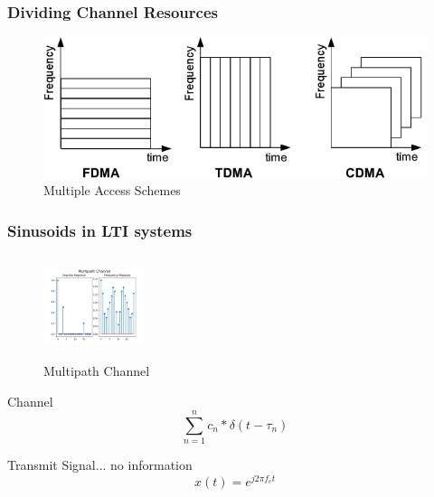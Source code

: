\documentclass{beamer}
\begin{document}


\begin{frame}
	\frametitle{Dividing Channel Resources}
	\begin{figure}
	\includegraphics[scale=1]{Images/Output/FDMA-TDMA-CDMA-Frequency-Time-division.png}
		\caption{Multiple Access Schemes}
	\end{figure}
\end{frame}


\begin{frame}[squeeze]
\frametitle{Sinusoids in LTI systems}

	\begin{figure}[
	]
			\includegraphics[scale=.6, height=3cm, width=3cm]{Images/Output/Multipath_Channel.png}
		\caption{Multipath Channel}
	\end{figure}

%

			
			Channel
			\begin{equation*}
				\sum_{n=1}^{n} c_n*\delta(t-\tau_n)
			\end{equation*}
			
			Transmit Signal... no information
			\begin{equation*}
				x(t) = e^{j2\pi f_c t}
			\end{equation*}
\end{frame}
\end{document}
